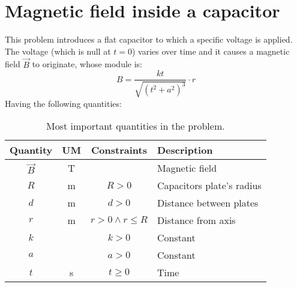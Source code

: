 
\chapter[Magnetism and capacitors]{Magnetic field inside a
capacitor}
\label{ch:tufte-book}

This problem introduces a flat capacitor to which
a specific voltage is applied. The voltage (which is null at $t = 0$)
varies over time and it causes a magnetic field $\vec{B}$ to originate,
whose module is:
\begin{equation}\label{eq:bdef}
    B = \frac{k t}{\sqrt{\left( t^2 + a^2 \right)^3}} \cdot r
\end{equation}
Having the following
quantities:

\begin{table}[h]
\begin{center}
    \footnotesize%
    \begin{tabular}{cccl}
    \toprule
    Quantity & UM & Constraints & Description \\
    \midrule
    $\vec{B}$ & \unit{T} & & Magnetic field \\
    $R$ & \unit{m} & $R > 0$ & Capacitors plate's radius \\
    $d$ & \unit{m} & $d > 0$ & Distance between plates \\
    $r$ & \unit{m} & $r > 0 \wedge r \leq R$ & Distance from axis \\
    $k$ & & $k > 0$ & Constant \\
    $a$ & & $a > 0$ & Constant \\
    $t$ & \unit{s} & $t \geq 0$ & Time \\
    \bottomrule
    \end{tabular}
\end{center}
\caption{Most important quantities in the problem.}
\label{tab:quants}
\end{table}

